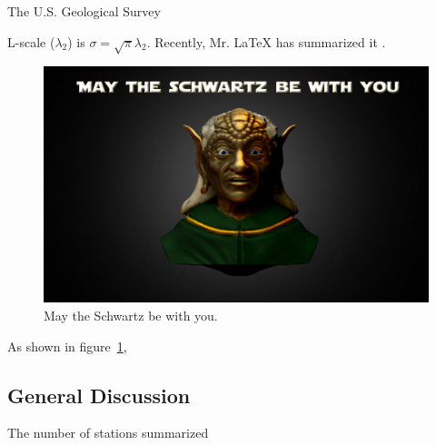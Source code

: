 \documentclass[11pt,twoside,twocolumn]{usgsreport}
\begin{document}
\makefrontcover
\makefrontmatter
\pagestyle{body}

The U.S. Geological Survey \lipsum[2-3]

L-scale ($\lambda_2$) is $\sigma = \sqrt{\pi}\lambda_2$. Recently, Mr. LaTeX has summarized it \citep{ASQUITH20074484}. \lipsum[150-150]

\lipsum[4-5]

\begin{figure}
\begin{center}
	\includegraphics[width=\linewidth]{Cover}

\caption{May the Schwartz be with you.}
\label{fig-1}
\end{center}
\end{figure}


As shown in figure~\ref{fig-1}, \lipsum[34-36]


\subsection{General Discussion}

The number of stations summarized \lipsum[40-50]

\lipsum[14-20]

\REFSECTION




\vspace*{\fill}
\clearpage
\pagestyle{backofreport}
\makebackcover
\end{document}
